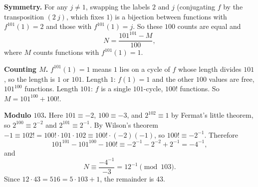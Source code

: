 \textbf{Symmetry.} For any $j\ne1$, swapping the labels $2$ and $j$ (conjugating $f$ by the transposition $(2\ j)$, which fixes $1$) is a bijection between functions with $f^{101}(1)=2$ and those with $f^{101}(1)=j$. So these $100$ counts are equal and
\[
N=\dfrac{101^{101}-M}{100},
\]
where $M$ counts functions with $f^{101}(1)=1$.

\textbf{Counting $M$.} $f^{101}(1)=1$ means $1$ lies on a cycle of $f$ whose length divides $101$, so the length is $1$ or $101$. Length $1$: $f(1)=1$ and the other $100$ values are free, $101^{100}$ functions. Length $101$: $f$ is a single $101$-cycle, $100!$ functions. So $M=101^{100}+100!$.

\textbf{Modulo $103$.} Here $101\equiv-2$, $100\equiv-3$, and $2^{102}\equiv1$ by Fermat's little theorem, so $2^{100}\equiv2^{-2}$ and $2^{101}\equiv2^{-1}$. By Wilson's theorem $-1\equiv102!=100!\cdot101\cdot102\equiv100!\cdot(-2)(-1)$, so $100!\equiv-2^{-1}$. Therefore
\[
101^{101}-101^{100}-100!\equiv-2^{-1}-2^{-2}+2^{-1}=-4^{-1},
\]
and
\[
N\equiv\dfrac{-4^{-1}}{-3}=12^{-1}\pmod{103}.
\]
Since $12\cdot43=516=5\cdot103+1$, the remainder is $\boxed{43}$.
